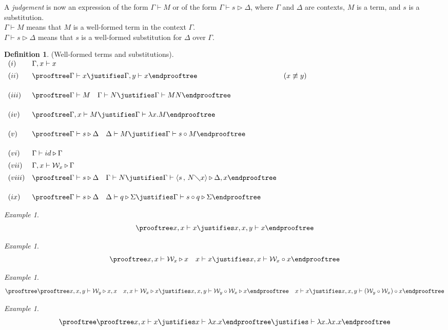 \documentclass[11pt]{amsart}
\def\ruleone#1#2{\prooftree #1 \justifies #2 \endprooftree}
\def\ruletwo#1#2#3{\ruleone{#1\quad #2}{#3}}
\theoremstyle{plain}
\theoremstyle{definition}
\newtheorem{definition}[theorem]{Definition}
\theoremstyle{remark}
\newtheorem{example}[theorem]{Example}
\numberwithin{equation}{section}
\newcommand{\tri}{\triangleright}
\newcommand{\ci}{\circ}
\newcommand{\mi}{\,,\,}
\newcommand{\is}{\diagdown}
\renewcommand{\pi}{\mathcal{W}}
\begin{document}
A \emph{judgement} is now an expression of the form $\Gamma\vdash
M$ or of the form $\Gamma\vdash s\tri\Delta$, where $\Gamma$ and
$\Delta$
are contexts,  $M$ is a term, and $s$ is a substitution.\\
$\Gamma\vdash M$ means that $M$ is a well-formed term in the
context
$\Gamma$.\\
$\Gamma\vdash s\tri\Delta$ means that $s$ is a well-formed
substitution for $\Delta$ over $\Gamma$.
\begin{definition}(Well-formed terms and substitutions).\label{well}\\
 $
\begin{array}{lll}
(i)& \Gamma,x\vdash x &\\[5pt]
(ii)& \ruleone{\Gamma\vdash
x}{\Gamma,y\vdash x} & (x\not\equiv y) \\[15pt]
(iii)& \ruletwo{\Gamma\vdash M}{\Gamma\vdash N}{\Gamma\vdash
MN} &\\[15pt]
(iv)& \ruleone{\Gamma,x\vdash M}{\Gamma\vdash\lambda x.M} &\\[15pt]
(v)& \ruletwo{\Gamma\vdash s\tri\Delta}{\Delta\vdash
M}{\Gamma\vdash
 s\ci M} &\\[15pt]
(vi)& \Gamma\vdash id\tri\Gamma &\\[5pt]
(vii)& \Gamma,x\vdash\pi_{x} \tri\Gamma &\\[5pt]
(viii)& \ruletwo{\Gamma\vdash s\tri\Delta}{\Gamma\vdash
N}{\Gamma\vdash
\langle s\mi N\is x\rangle\tri\Delta ,x} &\\[15pt]
(ix)& \ruletwo{\Gamma\vdash s\tri\Delta}{\Delta\vdash
q\tri\Sigma}{\Gamma\vdash s\ci q\tri\Sigma} &
\end{array}
$
 \end{definition}
\begin{example}
$$
\ruleone{x,x\vdash x}{x,x,y\vdash x}
$$
\end{example}
\begin{example}
$$
\ruletwo{x,x\vdash \pi_x\tri x}{x\vdash x}{x,x\vdash \pi_x\ci x}
$$
\end{example}
\begin{example}
$$
\ruletwo{\ruletwo{x,x,y\vdash \pi_y\tri x,x}{x,x\vdash \pi_x\tri
x}{x,x,y\vdash\pi_y\ci\pi_x\tri x}}{x\vdash x}{x,x,y\vdash
(\pi_y\ci\pi_x)\ci x}
$$
\end{example}
\begin{example}
$$
\ruleone{\ruleone{x,x\vdash x}{x\vdash\lambda x.x}}{\vdash\lambda
x.\lambda x.x}
$$
\end{example}
\end{document}
